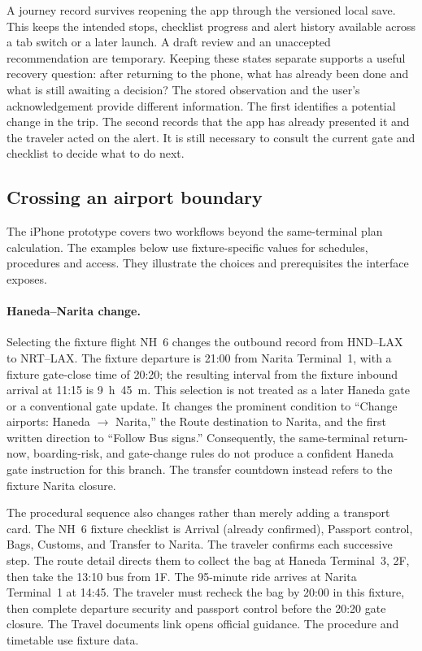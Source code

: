 \documentclass[sigconf,nonacm,balance=false]{acmart}
\begin{document}
A journey record survives reopening the app through the versioned local save. This keeps the intended stops, checklist progress and alert history available across a tab switch or a later launch. A draft review and an unaccepted recommendation are temporary. Keeping these states separate supports a useful recovery question: after returning to the phone, what has already been done and what is still awaiting a decision? The stored observation and the user's acknowledgement provide different information. The first identifies a potential change in the trip. The second records that the app has already presented it and the traveler acted on the alert. It is still necessary to consult the current gate and checklist to decide what to do next.

\subsection{Crossing an airport boundary}

The iPhone prototype covers two workflows beyond the same-terminal plan calculation.  The examples below use fixture-specific values for schedules, procedures and access. They illustrate the choices and prerequisites the interface exposes.

\paragraph{Haneda--Narita change.} Selecting the fixture flight NH~6 changes the
outbound record from HND--LAX to NRT--LAX.  The fixture departure is 21:00 from
Narita Terminal~1, with a fixture gate-close time of 20:20; the resulting interval
from the fixture inbound arrival at 11:15 is 9~h~45~m.  This selection is not
treated as a later Haneda gate or a conventional gate update.  It changes the
prominent condition to ``Change airports: Haneda $\rightarrow$ Narita,'' the Route
destination to Narita, and the first written direction to ``Follow Bus signs.''
Consequently, the same-terminal return-now, boarding-risk, and gate-change rules
do not produce a confident Haneda gate instruction for this branch.  The transfer
countdown instead refers to the fixture Narita closure.

The procedural sequence also changes rather than merely adding a transport card.
The NH~6 fixture checklist is Arrival (already confirmed), Passport control, Bags,
Customs, and Transfer to Narita.  The traveler confirms each successive step. The route detail directs them to collect the bag at Haneda Terminal~3, 2F, then take the 13:10 bus from 1F. The 95-minute ride arrives at Narita Terminal~1 at 14:45. The traveler must recheck the bag by 20:00 in this fixture, then complete departure security and passport control before the 20:20 gate closure. The Travel documents link opens official guidance. The procedure and timetable use fixture data.
\end{document}
